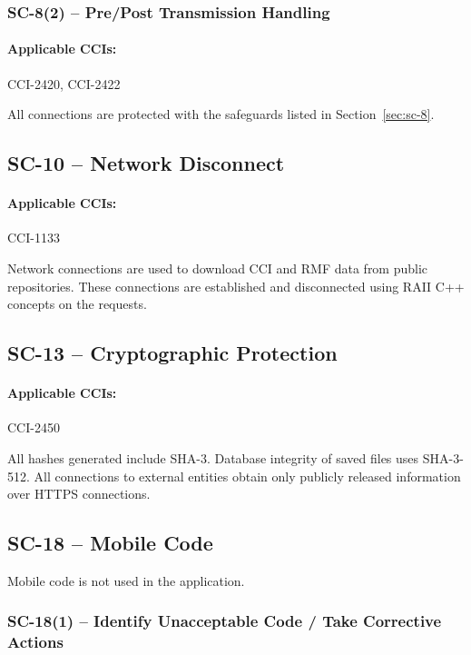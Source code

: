\documentclass[letterpaper, 10pt, twoside]{article}
\begin{document}
\subsubsection{SC-8(2) -- Pre/Post Transmission Handling}

\paragraph{Applicable CCIs:} CCI-2420, CCI-2422

All connections are protected with the safeguards listed in Section~\ref{sec:sc-8}.

\subsection{SC-10 -- Network Disconnect}

\paragraph{Applicable CCIs:} CCI-1133

Network connections are used to download CCI and RMF data from public repositories. These connections are established and disconnected using RAII C++ concepts on the requests.

\subsection{SC-13 -- Cryptographic Protection}

\paragraph{Applicable CCIs:} CCI-2450

All hashes generated include SHA-3. Database integrity of saved files uses SHA-3-512. All connections to external entities obtain only publicly released information over HTTPS connections.

\subsection{SC-18 -- Mobile Code}
\label{sec:sc-18}

Mobile code is not used in the application.

\subsubsection{SC-18(1) -- Identify Unacceptable Code / Take Corrective Actions}
\end{document}
